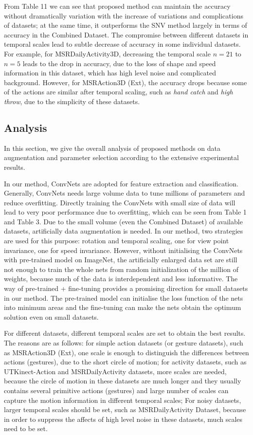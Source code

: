\documentclass[conference]{IEEEtran}
\begin{document}
From Table 11 we can see that proposed method can maintain the accuracy without dramatically variation with the increase of variations and complications of datasets; at the same time, it outperforms the SNV method largely in terms of accuracy in the Combined Dataset. The compromise between different datasets in temporal scales lead to subtle decrease of accuracy in some individual datasets. For example, for MSRDailyActivity3D, decreasing the temporal scale $n = 21$ to $n = 5$ leads to the drop in accuracy, due to the loss of shape and speed information in this dataset, which has high level noise and complicated background. However, for MSRAction3D (Ext), the accuracy drops because some of the actions are similar after temporal scaling, such as \textit{hand catch} and \textit{high throw}, due to the simplicity of these datasets.

\subsection{Analysis}
In this section, we give the overall analysis of proposed methods on data augmentation and parameter selection according to the extensive experimental results.

In our method, ConvNets are adopted for feature extraction and classification. Generally, ConvNets needs large volume data to tune millions of parameters and reduce overfitting. Directly training the ConvNets with small size of data will lead to very poor performance due to overfitting, which can be seen from Table 1 and Table 3. Due to the small volume (even the Combined Dataset) of available datasets, artificially data augmentation is needed. In our method, two strategies are used for this purpose: rotation and temporal scaling, one for view point invariance, one for speed invariance. However, without initialising the ConvNets with pre-trained model on ImageNet, the artificially enlarged data set are still not enough to train the whole nets from random initialization of the million of weights, because much of the data is interdependent and less informative. The way of pre-trained + fine-tuning provides a promising direction for small datasets in our method. The pre-trained model can initialise the loss function of the nets into minimum areas and the fine-tuning can make the nets obtain the optimum solution even on small datasets.

For different datasets, different temporal scales are set to obtain the best results. The reasons are as follows: for simple action datasets (or gesture datasets), such as MSRAction3D (Ext), one scale is enough to distinguish the differences between actions (gestures), due to the short circle of motion; for activity datasets, such as UTKinect-Action and MSRDailyActivity datasets, more scales are needed, because the circle of motion in these datasets are much longer and they usually contains several primitive actions (gestures) and large number of scales can capture the motion information in different temporal scales; For noisy datasets, larger temporal scales should be set, such as MSRDailyActivity Dataset, because in order to suppress the affects of high level noise in these datasets, much scales need to be set.
\end{document}
